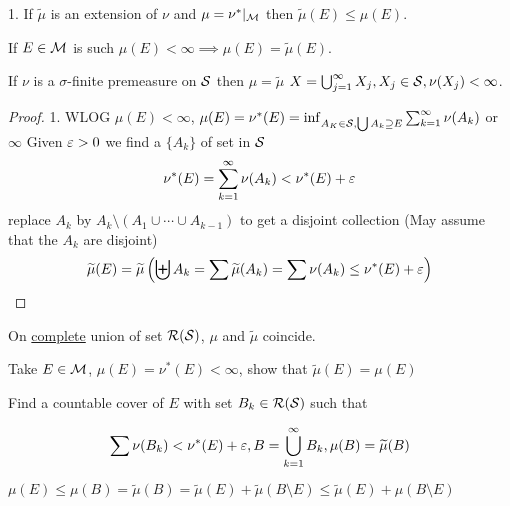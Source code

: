 




1. If $\widetilde{\mu}$ is an extension of $\nu$ and $\mu = \nu^*|_{\mathcal M}$ then $\widetilde{\mu}(E) \le \mu(E)$. 

  If $E \in \mathcal M$ is such $\mu(E) < \infty\implies \mu(E) = \widetilde{\mu}(E)$.  

If $\nu$ is a $\sigma$-finite premeasure on $\mathcal S$ then $\mu = \widetilde{\mu}$
$X = \bigcup_{j=1}^\infty X_j, X_j \in \mathcal S, \nu(X_j) < \infty$. 

\begin{proof}
  1. WLOG $\mu(E) < \infty$, $\mu(E) = \nu^*(E) = \inf_{A_K \in \mathcal S, \bigcup A_k \supseteq E} \sum_{k=1}^\infty \nu(A_k)$ or $\infty$
  Given $\varepsilon > 0$ we find a $\{A_k\}$ of set in $\mathcal S$
  \[\nu^*(E) = \sum_{k=1}^\infty \nu(A_k) < \nu^*(E) + \varepsilon\]
  replace $A_k$ by $A_k \setminus(A_1 \cup \dotsm \cup A_{k-1})$ to get a disjoint collection
  (May assume that the $A_k$ are disjoint)
  \[\widetilde{\mu}(E) = \widetilde{\mu}\left(\biguplus A_k = \sum \widetilde{\mu}(A_k) = \sum \nu(A_k) \le \nu^*(E) + \varepsilon\right)\]
\end{proof}

On \underline{complete} union of set $\mathcal R(\mathcal S)$, $\mu$ and $\widetilde{\mu}$ coincide.

Take $E \in \mathcal M$, $\mu(E) = \nu^*(E) < \infty$, show that $\widetilde{\mu}(E) = \mu(E)$

Find a countable cover of $E$ with set $B_k \in \mathcal R(\mathcal S)$ such that 

\[\sum \nu(B_k) < \nu^*(E) + \varepsilon, B = \bigcup_{k=1}^\infty B_k, \mu(B) = \widetilde{\mu}(B)\]

$\mu(E) \le \mu(B) = \widetilde{\mu}(B) = \widetilde{\mu}(E) + \widetilde{\mu}(B\setminus E) \le \widetilde{\mu}(E) + \mu(B\setminus E)$

